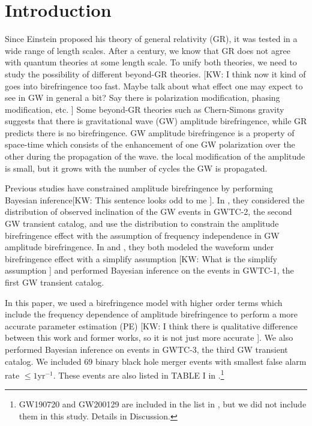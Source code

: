 \documentclass[aps,prd,twocolumn,superscriptaddress,preprintnumbers,floatfix,nofootinbib]{revtex4-2}
\newcommand{\kw}[1]{{\color{rb4}[KW: #1 ]}}
\begin{document}
\section{Introduction}
\label{sec:Introduction}
Since Einstein proposed his theory of general relativity (GR), it was tested in
a wide range of length scales. After a century, we know that GR does not agree
with quantum theories at some length scale. To unify both theories, we need to
study the possibility of different beyond-GR theories. \kw{I think now it kind
of goes into birefringence too fast. Maybe talk about what effect one may expect
to see in GW in general a bit? Say there is polarization modification, phasing
modification, etc.} Some beyond-GR theories such as Chern-Simons gravity
suggests that there is gravitational wave (GW) amplitude birefringence, while GR
predicts there is no birefringence. GW amplitude birefringence is a property of
space-time which consists of the enhancement of one GW polarization over the
other during the propagation of the wave. the local modification of the
amplitude is small, but it grows with the number of cycles the GW is propagated.


Previous studies have constrained amplitude birefringence by performing Bayesian
inference\kw{This sentence looks odd to me}. In \citet{Okounkova_2022}, they
considered the distribution of observed inclination of the GW events in GWTC-2,
the second GW transient catalog, and use the distribution to constrain the
amplitude birefringence effect with the assumption of frequency independence in
GW amplitude birefringence. In \citet{Yamada_2020} and \citet{Wang_2021}, they
both modeled the waveform under birefringence effect with a simplify assumption
\kw{What is the simplify assumption} and performed Bayesian inference on the
events in GWTC-1, the first GW transient catalog.

In this paper, we used a birefringence model with higher order terms which
include the frequency dependence of amplitude birefringence to perform a more
accurate parameter estimation (PE) \kw{I think there is qualitative difference
between this work and former works, so it is not just more accurate}. We also
performed Bayesian inference on events in GWTC-3, the third GW transient
catalog. We included 69 binary black hole merger events with smallest false
alarm rate $\leq1\mathrm{yr^{-1}}$. These events are also listed in TABLE I in
\citet{GWTC_3_population}.\footnote{GW190720 and GW200129 are included in the
list in \citet{GWTC_3_population}, but we did not include them in this study.
Details in Discussion.}
\end{document}
